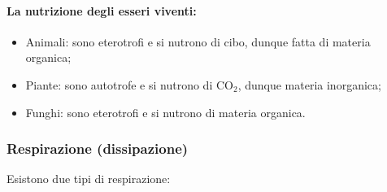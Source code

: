 \documentclass{article}
\begin{document}
\paragraph{La nutrizione degli esseri viventi:}
\begin{itemize}
    \item Animali: sono eterotrofi e si nutrono di cibo, dunque fatta di materia organica;
    \item Piante: sono autotrofe e si nutrono di CO$_2$, dunque materia inorganica;
    \item Funghi: sono eterotrofi e si nutrono di materia organica.
\end{itemize}

\subsubsection{Respirazione (dissipazione)}
Esistono due tipi di respirazione:
\end{document}
